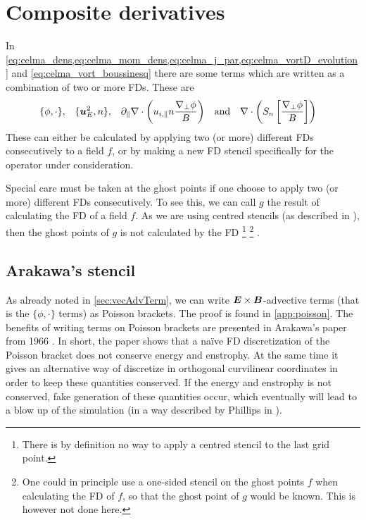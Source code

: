 \section{Composite derivatives}
\label{sec:compDeriv}
%
In \cref{eq:celma_dens,eq:celma_mom_dens,eq:celma_j_par,eq:celma_vortD_evolution} and \cref{eq:celma_vort_boussinesq} there are some terms which are written as a combination of two or more FDs.
These are
%
\begin{align*}
    &\{\phi,\cdot\},&
    &\{\boldsymbol{u}_E^2,n\},&
    &\partial_\|\nabla\cdot \left( u_{i,\|}n \frac{\nabla_\perp \phi}{B}\right)&
    &\text{and}&
    &\nabla\cdot \left( S_n \left[ \frac{ \nabla_\perp \phi }{ B } \right] \right)&
\end{align*}
%
These can either be calculated by applying two (or more) different FDs consecutively to a field $f$, or by making a new FD stencil specifically for the operator under consideration.

Special care must be taken at the ghost points if one choose to apply two (or more) different FDs consecutively.
To see this, we can call $g$ the result of calculating the FD of a field $f$.
As we are using centred stencils (as described in
), then the ghost points of $g$ is not calculated by the FD%
%
\footnote{There is by definition no way to apply a centred stencil to the last grid point.}%
%
\footnote{One could in principle use a one-sided stencil on the ghost points $f$ when calculating the FD of $f$, so that the ghost point of $g$ would be known.
This is however not done here.}
%
.

\subsection{Arakawa's stencil}
%
As already noted in \cref{sec:vecAdvTerm}, we can write $\boldsymbol{E}\times\boldsymbol{B}$-advective terms (that is the $\{\phi,\cdot\}$ terms) as Poisson brackets.
The proof is found in \cref{app:poisson}.
The benefits of writing terms on Poisson brackets are presented in Arakawa's paper from 1966 \cite{Arakwa1966}.
In short, the paper shows that a na\"ive FD discretization of the Poisson bracket does not conserve energy and enstrophy.
At the same time it gives an alternative way of discretize in orthogonal curvilinear coordinates in order to keep these quantities conserved.
If the energy and enstrophy is not conserved, fake generation of these quantities occur, which eventually will lead to a blow up of the simulation (in a way described by Phillips in \cite{Phillips1959}).

